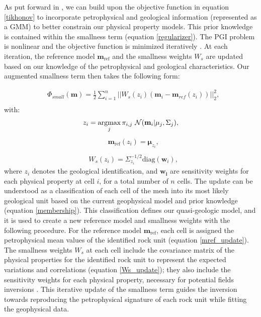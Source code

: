 \documentclass[paper, twocolumn]{geophysics} %
\begin{document}
As put forward in \citet{ggz389}, we can build upon the objective function in equation \ref{tikhonov} to incorporate petrophysical and geological information (represented as a GMM) to better constrain our physical property models. This prior knowledge is contained within the smallness term (equation \ref{regularizer}). The PGI problem is nonlinear and the objective function is minimized iteratively \citep{Tutorial}. At each iteration, the reference model $\mathbf{m}_{\text{ref}}$ and the smallness weights $W_{s}$ are updated based on our knowledge of the petrophysical and geological characteristics. Our augmented smallness term then takes the following form:

\begin{align}
&\Phi_{small}(\mathbf{m}) = \frac{1}{2}\sum_{i=1}^n||W_{s}(z_i)(\mathbf{m}_i-\mathbf{m}_{ref}(z_i))||_2^2, \label{smallness_petro}\\
\end{align}
with:
\begin{align}
&z_i = \mathop{\hbox{argmax}}\limits_{j} \pi_{i,j}~\mathcal{N}(\mathbf{m}_i|\mathbf{\mu}_j, \Sigma_j), \label{membership} \\
\end{align}
\begin{align}
&\mathbf{m}_{\text{ref}}(z_i) = \mathbf{\mu}_{z_i}, \label{mref_update}\\
\end{align}
\begin{align}
&W_{s}(z_i) = \Sigma_{z_i}^{-1/2}\text{diag}(\mathbf{w}_{{i}}), \label{Ws_update}
\end{align}
where $z_i$ denotes the geological identification, and $\mathbf{w_i}$ are sensitivity weights for each physical property at cell $i$, for a total number of $n$ cells.
The update can be understood as a classification of each cell of the mesh into its most likely geological unit based on the current geophysical model and prior knowledge (equation \ref{membership}). This classification defines our quasi-geologic model, and it is used to create a new reference model and smallness weights with the following procedure. For the reference model $\mathbf{m}_{\text{ref}}$, each cell is assigned the petrophysical mean values of the identified rock unit (equation \ref{mref_update}). The smallness weights $W_{s}$ at each cell include the covariance matrix of the physical properties for the identified rock unit to represent the expected variations and correlations (equation \ref{Ws_update}); they also include the sensitivity weights for each physical property, necessary for potential fields inversions \citep{Li1996, Li1998, Li2001}. This iterative update of the smallness term guides the inversion towards reproducing the petrophysical signature of each rock unit while fitting the geophysical data.
\end{document}
